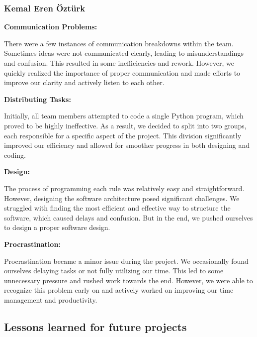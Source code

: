 \subsubsection{Kemal Eren Öztürk}



\textbf{Communication Problems:}

There were a few instances of communication breakdowns within the team. Sometimes ideas were not communicated clearly, leading to misunderstandings and confusion. This resulted in some inefficiencies and rework. However, we quickly realized the importance of proper communication and made efforts to improve our clarity and actively listen to each other.

\vspace{\baselineskip}


\textbf{Distributing Tasks:}

Initially, all team members attempted to code a single Python program, which proved to be highly ineffective. As a result, we decided to split into two groups, each responsible for a specific aspect of the project. This division significantly improved our efficiency and allowed for smoother progress in both designing and coding.

\vspace{\baselineskip}

\textbf{Design:}

The process of programming each rule was relatively easy and straightforward. However, designing the software architecture posed significant challenges. We struggled with finding the most efficient and effective way to structure the software, which caused delays and confusion. But in the end, we pushed ourselves to design a proper software design.

\vspace{\baselineskip}

\textbf{Procrastination:}

Procrastination became a minor issue during the project. We occasionally found ourselves delaying tasks or not fully utilizing our time. This led to some unnecessary pressure and rushed work towards the end. However, we were able to recognize this problem early on and actively worked on improving our time management and productivity.

\subsection{Lessons learned for future projects}

